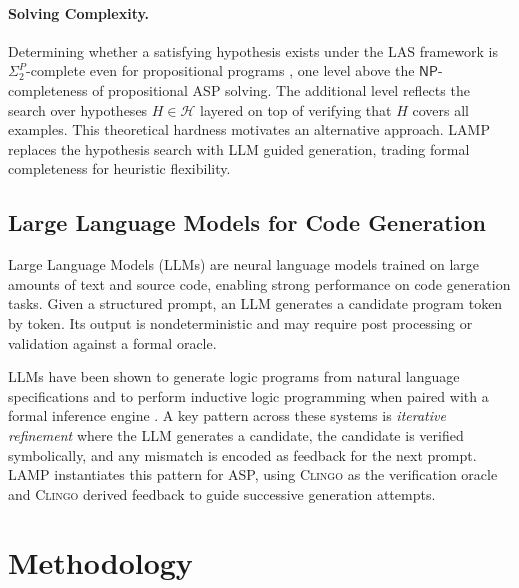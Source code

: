 \documentclass[11pt,a4paper]{article}
\begin{document}
\paragraph{Solving Complexity.}
Determining whether a satisfying hypothesis exists under the LAS framework is $\Sigma_2^P$-complete even for propositional programs \cite{law2018complexitygeneralitylearning}, one level above the $\mathsf{NP}$-completeness of propositional ASP solving. The additional level reflects the search over hypotheses $H \in \mathcal{H}$ layered on top of verifying that $H$ covers all examples. This theoretical hardness motivates an alternative approach. LAMP replaces the hypothesis search with LLM guided generation, trading formal completeness for heuristic flexibility.

\subsection{Large Language Models for Code Generation}

Large Language Models (LLMs) are neural language models trained on large amounts of text and source code, enabling strong performance on code generation tasks. Given a structured prompt, an LLM generates a candidate program token by token. Its output is nondeterministic and may require post processing or validation against a formal oracle.

LLMs have been shown to generate logic programs from natural language specifications \cite{ishay2023leveraginglargelanguagemodels, li2025logicofthoughtempoweringlargelanguage, lin2024clmaspcouplinglargelanguage} and to perform inductive logic programming when paired with a formal inference engine \cite{gandarela2025inductivelearninglogicaltheories}. A key pattern across these systems is \emph{iterative refinement} where the LLM generates a candidate, the candidate is verified symbolically, and any mismatch is encoded as feedback for the next prompt. LAMP instantiates this pattern for ASP, using \textsc{Clingo} as the verification oracle and \textsc{Clingo} derived feedback to guide successive generation attempts.

\section{Methodology}
\end{document}
